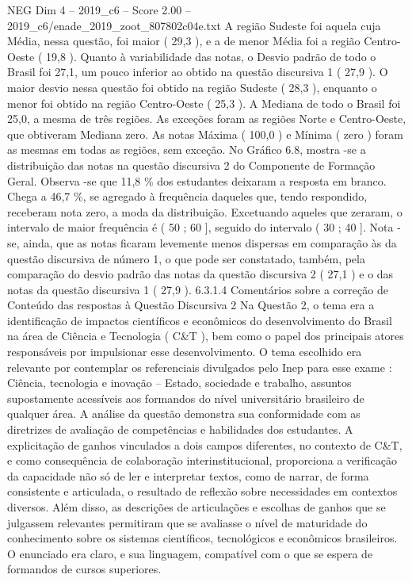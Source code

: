 \begin{textsample}{NEG Dim 4 – 2019\_c6 – Score 2.00 – 2019\_c6/enade\_2019\_zoot\_807802c04e.txt}
A região Sudeste foi aquela cuja Média, nessa questão, foi maior ( 29,3 ), e a de menor Média foi a região Centro-Oeste ( 19,8 ).
Quanto à variabilidade das notas, o Desvio padrão de todo o Brasil foi 27,1, um pouco inferior ao obtido na questão discursiva 1 ( 27,9 ).
O maior desvio nessa questão foi obtido na região Sudeste ( 28,3 ), enquanto o menor foi obtido na região Centro-Oeste ( 25,3 ).
A Mediana de todo o Brasil foi 25,0, a mesma de três regiões.
As exceções foram as regiões Norte e Centro-Oeste, que obtiveram Mediana zero.
As notas Máxima ( 100,0 ) e Mínima ( zero ) foram as mesmas em todas as regiões, sem exceção.
No Gráfico 6.8, mostra -se a distribuição das notas na questão discursiva 2 do Componente de Formação Geral.
Observa -se que 11,8 \% dos estudantes deixaram a resposta em branco.
Chega a 46,7 \%, se agregado à frequência daqueles que, tendo respondido, receberam nota zero, a moda da distribuição.
Excetuando aqueles que zeraram, o intervalo de maior frequência é ( 50 ; 60 ], seguido do intervalo ( 30 ; 40 ].
Nota -se, ainda, que as notas ficaram levemente menos dispersas em comparação às da questão discursiva de número 1, o que pode ser constatado, também, pela comparação do desvio padrão das notas da questão discursiva 2 ( 27,1 ) e o das notas da questão discursiva 1 ( 27,9 ). 6.3.1.4 Comentários sobre a correção de Conteúdo das respostas à Questão Discursiva 2 Na Questão 2, o tema era a identificação de impactos científicos e econômicos do desenvolvimento do Brasil na área de Ciência e Tecnologia ( C\&T ), bem como o papel dos principais atores responsáveis por impulsionar esse desenvolvimento.
O tema escolhido era relevante por contemplar os referenciais divulgados pelo Inep para esse exame : Ciência, tecnologia e inovação – Estado, sociedade e trabalho, assuntos supostamente acessíveis aos formandos do nível universitário brasileiro de qualquer área.
A análise da questão demonstra sua conformidade com as diretrizes de avaliação de competências e habilidades dos estudantes.
A explicitação de ganhos vinculados a dois campos diferentes, no contexto de C\&T, e como consequência de colaboração interinstitucional, proporciona a verificação da capacidade não só de ler e interpretar textos, como de narrar, de forma consistente e articulada, o resultado de reflexão sobre necessidades em contextos diversos.
Além disso, as descrições de articulações e escolhas de ganhos que se julgassem relevantes permitiram que se avaliasse o nível de maturidade do conhecimento sobre os sistemas científicos, tecnológicos e econômicos brasileiros.
O enunciado era claro, e sua linguagem, compatível com o que se espera de formandos de cursos superiores.

\end{textsample}
